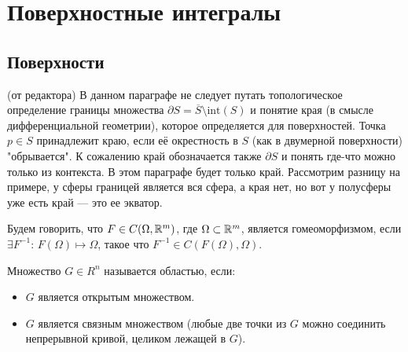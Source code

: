 \section{Поверхностные интегралы}
\subsection{Поверхности}
\begin{note}(от редактора)
В данном параграфе не следует путать топологическое определение границы множества $\partial S = \overline{S} \setminus \text{int}(S)$ и понятие края (в смысле дифференциальной геометрии), которое определяется для поверхностей. Точка $p\in S$ принадлежит краю, если её окрестность в $S$ (как в двумерной поверхности) "обрывается". К сожалению край обозначается также $\partial S$ и понять где-что можно только из контекста. В этом параграфе будет только край. Рассмотрим разницу на примере, у сферы границей является вся сфера, а края нет, но вот у полусферы уже есть край --- это ее экватор.
\end{note}

\begin{reminder}
\hypertarget{homeomorphism_definition}{}
Будем говорить, что $F \in C(\Omega, \mathbb{R}^m)$, где $\Omega \subset \mathbb{R}^m$, является гомеоморфизмом, если $\exists F^{-1}$: $F(\Omega) \mapsto \Omega$, такое что $F^{-1} \in C(F(\Omega), \Omega)$.
\end{reminder}

\begin{reminder}
    Множество $G \in R^n$ называется областью, если:
\begin{itemize}
    \item $G$ является открытым множеством.
    \item $G$ является связным множеством (любые две точки из $G$ можно соединить непрерывной кривой, целиком лежащей в $G$).
\end{itemize}
\end{reminder}

